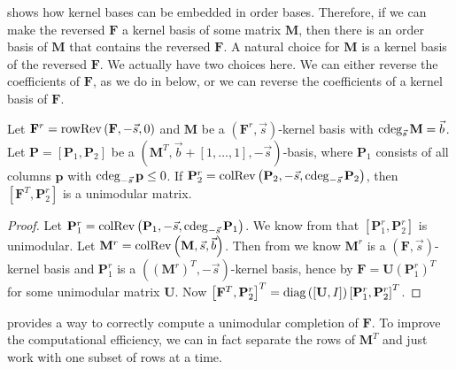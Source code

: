 shows how kernel bases can be embedded in order bases. Therefore,
if we can make the reversed $\mathbf{F}$ a kernel basis of some matrix
$\mathbf{M}$, then there is an order basis of $\mathbf{M}$ that
contains the reversed $\mathbf{F}$. A natural choice for $\mathbf{M}$
is a kernel basis of the reversed $\mathbf{F}$.  We actually have
two choices here. We can either reverse the coefficients of $\mathbf{F}$,
as we do in  below, or we can
reverse the coefficients of a kernel basis of $\mathbf{F}$.
\begin{lem}
\label{lem:unimodularComputation}Let $\mathbf{F}^{r}=\operatorname{rowRev}\left(\mathbf{F},-\vec{s},0\right)$
and $\mathbf{M}$ be a $(\mathbf{F}^{r},\vec{s})$-kernel basis with
$\cdeg_{\vec{s}}\mathbf{M}=\vec{b}$. Let $\mathbf{P}=\left[\mathbf{P}_{1},\mathbf{P}_{2}\right]$
be a $\left(\mathbf{M}^{T},\vec{b}+\left[1,\dots,1\right],-\vec{s}\right)$-basis,
where $\mathbf{P}_{1}$ consists of all columns $\mathbf{p}$ with
$\cdeg_{-\vec{s}}\mathbf{p}\le0$. If $\mathbf{P}_{2}^{r}=\colRev\left(\mathbf{P}_{2},-\vec{s},\cdeg_{-\vec{s}}\mathbf{P}_{2}\right)$,
then $\left[\mathbf{F}^{T},\mathbf{P}_{2}^{r}\right]$ is a unimodular
matrix.\end{lem}
\begin{proof}
Let $\mathbf{P}_{1}^{r}=\colRev\left(\mathbf{P}_{1},-\vec{s},\cdeg_{-\vec{s}}\mathbf{P}_{1}\right)$.
We know from  that $\left[\mathbf{P}_{1}^{r},\mathbf{P}_{2}^{r}\right]$
is unimodular. Let $\mathbf{M}^{r}=\operatorname{colRev}\left(\mathbf{M},\vec{s},\vec{b}\right)$.
Then from  we know $\mathbf{M}^{r}$
is a $\left(\mathbf{F},\vec{s}\right)$-kernel basis and $\mathbf{P}_{1}^{r}$
is a $\left(\left(\mathbf{M}^{r}\right)^{T},-\vec{s}\right)$-kernel
basis, hence by 
$\mathbf{F}=\mathbf{U}\left(\mathbf{P}_{1}^{r}\right)^{T}$ for some
unimodular matrix $\mathbf{U}$. Now $\left[\mathbf{F}^{T},\mathbf{P}_{2}^{r}\right]^{T}=\mbox{diag}\left(\left[\mathbf{U},I\right]\right)\left[\mathbf{P}_{1}^{r},\mathbf{P}_{2}^{r}\right]^{T}$.
\end{proof}
 provides a way to correctly
compute a unimodular completion of $\mathbf{F}$. To improve the computational
efficiency, we can in fact separate the rows of $\mathbf{M}^{T}$
and just work with one subset of rows at a time. 
